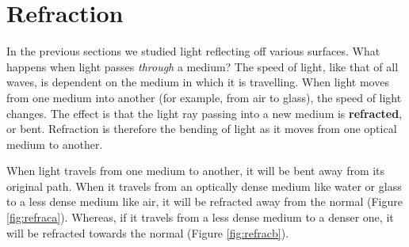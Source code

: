 \section{Refraction}

In the previous sections we studied light reflecting off various surfaces. What happens when light passes \textit{through} a medium? The speed of light, like that of all waves, is dependent on the medium in which it is travelling. When light moves from one medium into another (for example, from air to glass), the speed of light changes. The effect is that the light ray passing into a new medium is \textbf{refracted}, or bent. Refraction is therefore the bending of light as it moves from one optical medium to another.


When light travels from one medium to another, it will be bent away from its original path. When it travels from an optically dense medium like water or glass to a less dense medium like air, it will be refracted away from the normal (Figure \ref{fig:refraca}). Whereas, if it travels from a less dense medium to a denser one, it will be refracted towards the normal (Figure \ref{fig:refracb}).


